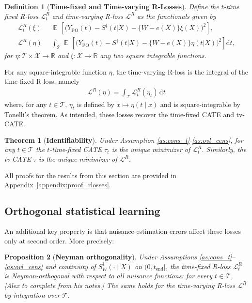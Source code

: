 \documentclass{article}
\newtheorem{theorem}{Theorem}
\newtheorem{proposition}[theorem]{Proposition}
\newtheorem{definition}{Definition}
\DeclareMathOperator*{\eqdef }{\,\stackrel{\text{def}}{=}\,}
\DeclareMathOperator{\EX}{\mathbb{E}\,}
\newcommand{\tend}{t_{\mathrm{end}}}
\newcommand{\R}{\mathbb{R}}
\newcommand{\nd}{\mathrm{d}}
\begin{document}
\begin{definition}[{\bf Time-fixed and Time-varying R-Losses}]\label{def:loss}
Define the $t$-time fixed R-loss $\mathcal{L}^R_t$ and time-varying R-loss $\mathcal{L}^R$ as the functionals given by
\begin{align*}
\mathcal{L}_t^R(\xi) &\eqdef \EX \left[ \Big(Y_{\mathrm{PO}}(t)- S^\dag(t|X) -\{W-e(X)\}\xi(X)\Big)^2 \right],\\
\mathcal{L}^{R}(\eta) &\eqdef \int_{\mathcal{T}} \EX \left[ \Big(Y_{\mathrm{PO}}(t)-S^\dag(t|X)-\{W-e(X)\}\eta(t|X)\Big)^2 \right] \nd t,
\end{align*}
for $\eta : \mathcal{T} \times \mathcal{X} \to \R$ and $\xi : \mathcal{X} \to \R$ any two square integrable functions.
\end{definition}
%
For any square-integrable function $\eta$, the time-varying R-loss is the integral of the time-fixed R-loss, namely
\begin{align*}
\mathcal{L}^R(\eta)=\int_{\mathcal{T}} \mathcal{L}_t^R(\eta_t)\,\nd t
\end{align*}
where, for any $t \in \mathcal{T}$, $\eta_t$ is defined by $x \mapsto \eta(t\mid x)$ and is square-integrable by Tonelli's theorem.
As intended, these losses recover the time-fixed CATE and tv-CATE. 
\begin{theorem}[{\bf Identifiability}]\label{thm:loss}
Under Assumption \ref{as:cons_t}-\ref{as:ovl_cens}, for any $t \in \mathcal{T}$ the $t$-time-fixed CATE \( \tau_t \) is the unique minimizer of $\mathcal{L}_t ^{R}$. Similarly, the tv-CATE \( \tau \) is the unique minimizer of $\mathcal{L}^{R}$.
\end{theorem}


All proofs for the results from this section are provided in Appendix~\ref{appendix:proof_rlosses}.

\subsection{Orthogonal statistical learning}
An additional key property is that nuisance-estimation errors affect these losses only at second order. More precisely:
\begin{proposition}[{\bf Neyman orthogonality}]\label{prop:neyman_ort}
Under Assumptions \ref{as:cons_t}–\ref{as:ovl_cens} and continuity of $S^\dagger_W(\cdot\mid X)$ on $(0,\tend]$, the time-fixed R-loss $\mathcal{L}_t^R$ is Neyman-orthogonal with respect to all nuisance functions: for every $t\in\mathcal{T}$,
{\color{blue}\textit{[Alex to complete from his notes.]}}
The same holds for the time-varying R-loss $\mathcal{L}^R$ by integration over $\mathcal{T}$.
\end{proposition}
\end{document}
